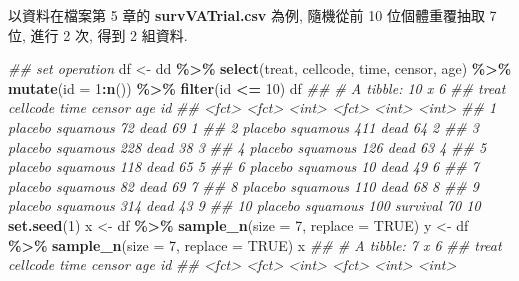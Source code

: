 \documentclass[
]{book}
\newenvironment{Shaded}{\begin{snugshade}}{\end{snugshade}}
\newcommand{\CommentTok}[1]{\textcolor[rgb]{0.56,0.35,0.01}{\textit{#1}}}
\newcommand{\DataTypeTok}[1]{\textcolor[rgb]{0.13,0.29,0.53}{#1}}
\newcommand{\DecValTok}[1]{\textcolor[rgb]{0.00,0.00,0.81}{#1}}
\newcommand{\KeywordTok}[1]{\textcolor[rgb]{0.13,0.29,0.53}{\textbf{#1}}}
\newcommand{\NormalTok}[1]{#1}
\newcommand{\OperatorTok}[1]{\textcolor[rgb]{0.81,0.36,0.00}{\textbf{#1}}}
\newcommand{\OtherTok}[1]{\textcolor[rgb]{0.56,0.35,0.01}{#1}}
\newcommand{\StringTok}[1]{\textcolor[rgb]{0.31,0.60,0.02}{#1}}
\begin{document}
以資料在檔案第 5 章的 \textbf{survVATrial.csv} 為例,
隨機從前 10 位個體重覆抽取 7 位, 進行 2 次, 得到 2 組資料.

\begin{Shaded}
\begin{Highlighting}[]
\CommentTok{\#\# set operation}
\NormalTok{df \textless{}{-}}\StringTok{ }\NormalTok{dd }\OperatorTok{\%\textgreater{}\%}\StringTok{ }
\StringTok{  }\KeywordTok{select}\NormalTok{(treat, cellcode, time, censor, age) }\OperatorTok{\%\textgreater{}\%}\StringTok{ }
\StringTok{  }\KeywordTok{mutate}\NormalTok{(}\DataTypeTok{id =} \DecValTok{1}\OperatorTok{:}\KeywordTok{n}\NormalTok{()) }\OperatorTok{\%\textgreater{}\%}
\StringTok{  }\KeywordTok{filter}\NormalTok{(id }\OperatorTok{\textless{}=}\StringTok{ }\DecValTok{10}\NormalTok{)}
\NormalTok{df}
\CommentTok{\#\# \# A tibble: 10 x 6}
\CommentTok{\#\#    treat   cellcode  time censor     age    id}
\CommentTok{\#\#    \textless{}fct\textgreater{}   \textless{}fct\textgreater{}    \textless{}int\textgreater{} \textless{}fct\textgreater{}    \textless{}int\textgreater{} \textless{}int\textgreater{}}
\CommentTok{\#\#  1 placebo squamous    72 dead        69     1}
\CommentTok{\#\#  2 placebo squamous   411 dead        64     2}
\CommentTok{\#\#  3 placebo squamous   228 dead        38     3}
\CommentTok{\#\#  4 placebo squamous   126 dead        63     4}
\CommentTok{\#\#  5 placebo squamous   118 dead        65     5}
\CommentTok{\#\#  6 placebo squamous    10 dead        49     6}
\CommentTok{\#\#  7 placebo squamous    82 dead        69     7}
\CommentTok{\#\#  8 placebo squamous   110 dead        68     8}
\CommentTok{\#\#  9 placebo squamous   314 dead        43     9}
\CommentTok{\#\# 10 placebo squamous   100 survival    70    10}
\KeywordTok{set.seed}\NormalTok{(}\DecValTok{1}\NormalTok{)}
\NormalTok{x \textless{}{-}}\StringTok{ }\NormalTok{df }\OperatorTok{\%\textgreater{}\%}\StringTok{ }\KeywordTok{sample\_n}\NormalTok{(}\DataTypeTok{size =} \DecValTok{7}\NormalTok{, }\DataTypeTok{replace =} \OtherTok{TRUE}\NormalTok{)}
\NormalTok{y \textless{}{-}}\StringTok{ }\NormalTok{df }\OperatorTok{\%\textgreater{}\%}\StringTok{ }\KeywordTok{sample\_n}\NormalTok{(}\DataTypeTok{size =} \DecValTok{7}\NormalTok{, }\DataTypeTok{replace =} \OtherTok{TRUE}\NormalTok{)}
\NormalTok{x}
\CommentTok{\#\# \# A tibble: 7 x 6}
\CommentTok{\#\#   treat   cellcode  time censor   age    id}
\CommentTok{\#\#   \textless{}fct\textgreater{}   \textless{}fct\textgreater{}    \textless{}int\textgreater{} \textless{}fct\textgreater{}  \textless{}int\textgreater{} \textless{}int\textgreater{}}

\end{Highlighting}
\end{Shaded}
\end{document}
